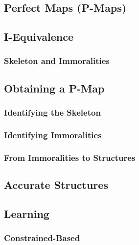 		\subsection{Perfect Maps (P-Maps)} %

		\subsection{I-Equivalence} %

			\subsubsection{Skeleton and Immoralities} %

		\subsection{Obtaining a P-Map} %

			\subsubsection{Identifying the Skeleton} %

			\subsubsection{Identifying Immoralities} %

			\subsubsection{From Immoralities to Structures} %

		\subsection{Accurate Structures} %

		\subsection{Learning} %

			\subsubsection{Constrained-Based} %

